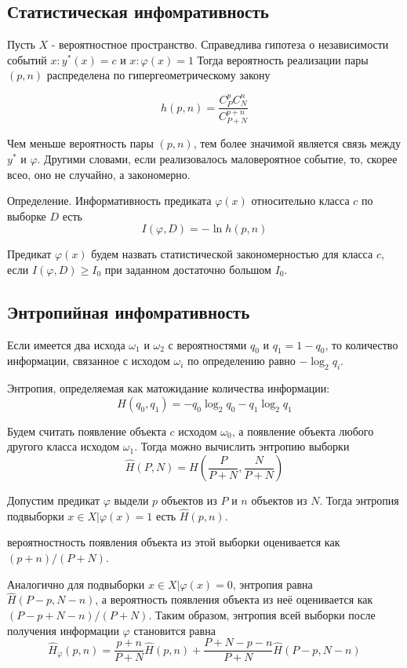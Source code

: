     \subsection{Статистическая инфомративность}

     Пусть $X$ - вероятностное пространство.
    Справедлива гипотеза о независимости событий ${x: y^*(x) = c}$ и ${x: \varphi(x) = 1}$
    Тогда вероятность реализации пары $(p, n)$ распределена по гипергеометрическому закону

    \[
    h(p, n) = \frac{C_P^p C_N^n}{C_{P + N}^{p + n}}
    \]

    Чем меньше вероятность пары $(p, n)$, тем более значимой является связь между 
    $y^*$ и $\varphi$. Другими словами, если реализовалось маловероятное событие, то,
    скорее всео, оно не случайно, а закономерно.

    Определение.
    Информативность предиката $\varphi(x)$ относительно класса $c$ по выборке $D$
    есть
    \[
    I(\varphi, D) = - \ln h(p, n)
    \]

    Предикат $\varphi(x)$ будем назвать статистической закономерностью для класса $c$, если
    $I(\varphi, D) \ge I_0$ при заданном достаточно большом $I_0$.
    
    \subsection{Энтропийная инфомративность}

    Если имеется два исхода $\omega_1$ и $\omega_2$ с вероятностями
    $q_0$ и $q_1 = 1 - q_0$, то количество информации, связанное с исходом
    $\omega_i$ по определению равно $-\log_2 q_i$.

    Энтропия, определяемая как матожидание количества информации:
    \[
    H(q_0, q_1) = - q_0 \log_2 q_0 - q_1 \log_2 q_1
    \]

    Будем считать появление объекта $c$ исходом $\omega_0$, а появление объекта
    любого другого класса исходом $\omega_1$. Тогда можно вычислить энтропию выборки
    \[
    \hat{H}(P, N) = H \left(\frac{P}{P + N}, \frac{N}{P + N} \right)
    \]

    Допустим предикат $\varphi$ выдели $p$ объектов из $P$ и $n$ объектов из $N$.
    Тогда энтропия подвыборки ${x \in X | \varphi(x) = 1}$ есть $\hat{H}(p, n)$.

    вероятностность появления объекта из этой выборки оценивается как $(p + n) / (P + N)$.

    Аналогично для подвыборки ${x \in X | \varphi(x) =0}$, энтропия равна $\hat{H}(P-p, N-n)$,
    а вероятность появления объекта из неё оценивается как $(P-p + N-n) / (P + N)$.
    Таким образом, энтропия всей выборки после получения информации $\varphi$ становится равна
    \[
    \hat{H}_{\varphi}(p, n) = \frac{p + n}{P + N}\hat{H}(p, n) 
    + \frac{P + N - p - n}{P + N} \hat{H}(P - p, N - n)
    \]

